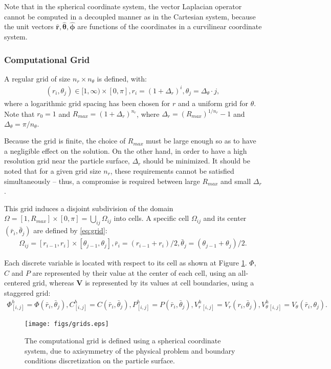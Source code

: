 \documentclass[preprint,10pt]{elsarticle}
\newcommand{\pars}[1]{\left(#1\right)}
\newcommand\bV{\boldsymbol{V}}
\newcommand\br{\boldsymbol{r}}
\newcommand\brhat{\hat{\br}}
\newcommand\btheta{\boldsymbol{\theta}}
\newcommand\bthetahat{\hat{\btheta}}
\newcommand\bphi{\boldsymbol{\phi}}
\newcommand\bphihat{\hat{\bphi}}
\begin{document}
Note that in the spherical coordinate system,
the vector Laplacian operator cannot be computed in a decoupled manner as in the Cartesian system,
because the unit vectors $\brhat, \bthetahat, \bphihat$ are functions of the coordinates
in a curvilinear coordinate system.

\subsubsection{Computational Grid}
A regular grid of size $n_r \times n_\theta$ is defined, with:
\begin{align} \label{eq:grid}
(r_i,\theta_j) \in [1, \infty) \times [0,\pi], 
r_i = (1+\Delta_r)^i, 
\theta_j = \Delta_\theta \cdot j,
\end{align}
where a logarithmic grid spacing has been chosen for $r$ and a uniform grid for $\theta$.
Note that $r_0 = 1$ and $R_{max} = (1+\Delta_r)^{n_r}$, where
$\Delta_r = \pars{R_{max}} ^ {1/n_r} - 1$ and $\Delta_\theta = {\pi/n_\theta}$.

Because the grid is finite, the choice of $R_{max}$ must be large enough 
so as to have a negligible effect on the solution. 
On the other hand, in order to have a high resolution grid near the particle surface,
$\Delta_r$ should be minimized. It should be noted that for a given grid size $n_r$,
these requirements cannot be satisfied simultaneously -- thus, a compromise is required
between large $R_{max}$ and small $\Delta_r$.

This grid induces a disjoint subdivision of the domain 
$\Omega = [1, R_{max}] \times [0,\pi] = \bigcup_{ij}\Omega_{ij}$ into cells.
A specific cell $\Omega_{ij}$ and its center $(\bar{r}_i, \bar{\theta}_j)$ are defined by \eqref{eq:grid}:
\begin{align}
\Omega_{ij} = [r_{i-1}, r_{i}] \times [\theta_{j-1}, \theta_{j}], 
\bar{r}_i = (r_{i-1} + r_{i})/2, 
\bar{\theta}_j = (\theta_{j-1} + \theta_{j})/2.
\end{align}

Each discrete variable is located with respect to its cell 
as shown at Figure \ref{fig:grids}.
$\varPhi$, $C$ and $P$ are represented by their value at the center of each cell, 
using an all-centered grid, whereas $\bV$ is represented by its values at cell 
boundaries, using a staggered grid:
\begin{align}
\varPhi^h_{[i,j]} = \varPhi(\bar{r}_i, \bar{\theta}_j), 
C^h_{[i,j]} = C(\bar{r}_i, \bar{\theta}_j), 
P^h_{[i,j]} = P(\bar{r}_i, \bar{\theta}_j), 
V_r^h{}_{[i,j]} = V_r(r_i, \bar{\theta}_j), 
V_\theta^h{}_{[i,j]} = V_\theta(\bar{r}_i, {\theta}_j).
\end{align}
\begin{figure}[h]
    \begin{center}
	\texttt{[image: figs/grids.eps]}
        \caption[Computational grid]{The computational grid is defined using
        a spherical coordinate system, due to axisymmetry of the physical problem
        and boundary conditions discretization on the particle surface.}
    \label{fig:grids}
    \end{center}
\end{figure}
\end{document}
